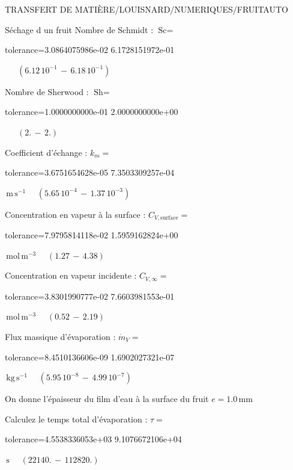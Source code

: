 \documentclass[12pt]{article}
\begin{document}
\begin{quiz}{TRANSFERT DE MATIÈRE/LOUISNARD/NUMERIQUES/FRUITAUTO}
\begin{cloze}{Séchage d un fruit}
Nombre de Schmidt : $\text{Sc} =  $
\begin{numerical}[points=1] 
\item[tolerance={3.0864075986e-02}] 6.1728151972e-01 
\end{numerical} 
 $\,$ 
 $ \quad ( 6.12 \, 10^{-1}  \, - \,  6.18 \, 10^{-1} ) $ 

Nombre de Sherwood : $\text{Sh} =  $
\begin{numerical}[points=2] 
\item[tolerance={1.0000000000e-01}] 2.0000000000e+00 
\end{numerical} 
 $\,$ 
 $ \quad (2. \, - \, 2.) $ 

Coefficient d'échange : $k_m =  $
\begin{numerical}[points=1] 
\item[tolerance={3.6751654628e-05}] 7.3503309257e-04 
\end{numerical} 
 $\,  \mathrm{m}\,  \mathrm{s}^{-1}$ 
 $ \quad ( 5.65 \, 10^{-4}  \, - \,  1.37 \, 10^{-3} ) $ 

Concentration en vapeur à la surface : $C_{V, \text{surface}} =  $
\begin{numerical}[points=2] 
\item[tolerance={7.9795814118e-02}] 1.5959162824e+00 
\end{numerical} 
 $\,  \mathrm{mol}\,  \mathrm{m}^{-3}$ 
 $ \quad (1.27 \, - \, 4.38) $ 

Concentration en vapeur incidente : $C_{V, \infty} =  $
\begin{numerical}[points=2] 
\item[tolerance={3.8301990777e-02}] 7.6603981553e-01 
\end{numerical} 
 $\,  \mathrm{mol}\,  \mathrm{m}^{-3}$ 
 $ \quad (0.52 \, - \, 2.19) $ 

Flux massique d'évaporation : $\dot{m}_V =  $
\begin{numerical}[points=1] 
\item[tolerance={8.4510136606e-09}] 1.6902027321e-07 
\end{numerical} 
 $\,  \mathrm{kg}\,  \mathrm{s}^{-1}$ 
 $ \quad ( 5.95 \, 10^{-8}  \, - \,  4.99 \, 10^{-7} ) $ 

 

On donne l'épaisseur du film d'eau à la surface du fruit $e = 1.0\,  \mathrm{mm} $

Calculez le temps total d'évaporation : $\tau =  $
\begin{numerical}[points=2] 
\item[tolerance={4.5538336053e+03}] 9.1076672106e+04 
\end{numerical} 
 $\,  \mathrm{s}$ 
 $ \quad (22140. \, - \, 112820.) $ 

\end{cloze} 


\end{quiz}
\end{document}
